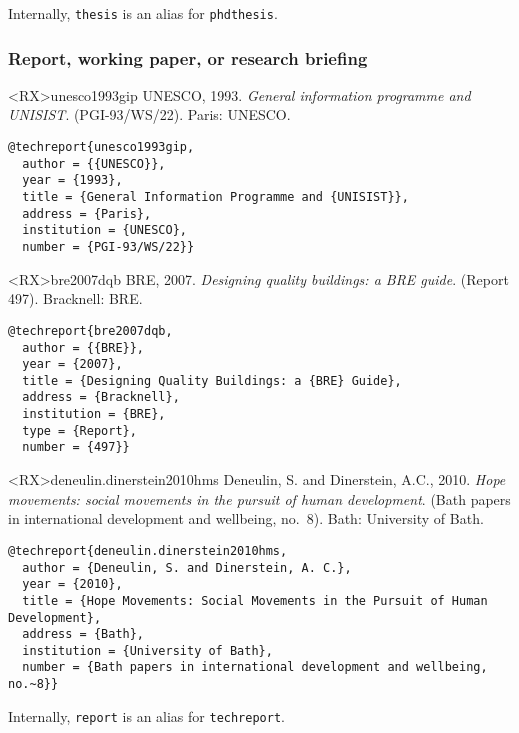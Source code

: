 \documentclass[10pt,a4paper]{article}
\newenvironment{info}{%
  \begin{list}{\makebox[2em][c]{\faInfoCircle}}{%
    \setlength{\leftmargin}{2em}
    \setlength{\labelwidth}{2em}
    \setlength{\labelsep}{0pt}}
}{\end{list}}
\begin{document}
\begin{info}\item
Internally, \texttt{thesis} is an alias for \texttt{phdthesis}.
\end{info}

\subsubsection*{Report, working paper, or research briefing}

\begin{bibexbox}<RX>{unesco1993gip}
  UNESCO, 1993. \emph{General information programme and UNISIST}\@. (PGI-93/WS/22). Paris: UNESCO.
  \tcblower
\begin{Verbatim}
@techreport{unesco1993gip,
  author = {{UNESCO}},
  year = {1993},
  title = {General Information Programme and {UNISIST}},
  address = {Paris},
  institution = {UNESCO},
  number = {PGI-93/WS/22}}
\end{Verbatim}
\end{bibexbox}

\begin{bibexbox}<RX>{bre2007dqb}
  BRE, 2007. \emph{Designing quality buildings: a BRE guide}. (Report 497). Bracknell: BRE.
  \tcblower
\begin{Verbatim}
@techreport{bre2007dqb,
  author = {{BRE}},
  year = {2007},
  title = {Designing Quality Buildings: a {BRE} Guide},
  address = {Bracknell},
  institution = {BRE},
  type = {Report},
  number = {497}}
\end{Verbatim}
\end{bibexbox}

\begin{bibexbox}<RX>{deneulin.dinerstein2010hms}
  Deneulin, S. and Dinerstein, A.C., 2010. \emph{Hope movements: social movements in the pursuit of human development}. (Bath papers in international development and wellbeing, no.~8). Bath: University of Bath.
  \tcblower
\begin{Verbatim}
@techreport{deneulin.dinerstein2010hms,
  author = {Deneulin, S. and Dinerstein, A. C.},
  year = {2010},
  title = {Hope Movements: Social Movements in the Pursuit of Human Development},
  address = {Bath},
  institution = {University of Bath},
  number = {Bath papers in international development and wellbeing, no.~8}}
\end{Verbatim}
\end{bibexbox}

\begin{info}\item
Internally, \texttt{report} is an alias for \texttt{techreport}.
\end{info}
\end{document}
